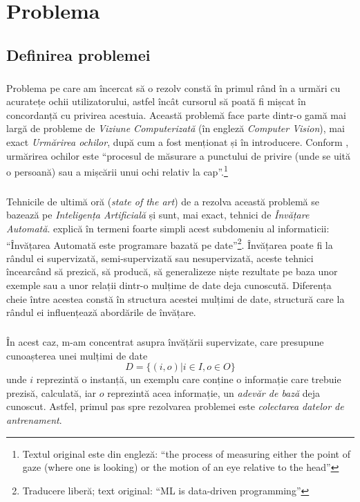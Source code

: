 \chapter{Problema}

\section{Definirea problemei}

\paragraph{}
Problema pe care am încercat să o rezolv constă în primul rând în a urmări cu acuratețe ochii utilizatorului, astfel încât cursorul să poată fi mișcat în concordanță cu privirea acestuia.
Această problemă face parte dintr-o gamă mai largă de probleme de \emph{Viziune Computerizată} (în engleză \emph{Computer Vision}), mai exact \emph{Urmărirea ochilor}, după cum a fost menționat și în introducere.
Conform \cite{eye_tracking}, urmărirea ochilor este ``procesul de măsurare a punctului de privire (unde se uită o persoană) sau a mișcării unui ochi relativ la cap''.\footnote{Textul original este din engleză: ``the process of measuring either the point of gaze (where one is looking) or the motion of an eye relative to the head''}

\paragraph{}
Tehnicile de ultimă oră (\emph{state of the art}) de a rezolva această problemă se bazează pe \emph{Inteligența Artificială} și sunt, mai exact, tehnici de \emph{Învățare Automată}.
\cite{liviu_ciortuz_ml} explică în termeni foarte simpli acest subdomeniu al informaticii: ``Învățarea Automată este programare bazată pe date''\footnote{Traducere liberă; text original: ``ML is data-driven programming''}.
Învățarea poate fi la rândul ei supervizată, semi-supervizată sau nesupervizată, aceste tehnici încearcând să prezică, să producă, să generalizeze niște rezultate pe baza unor exemple sau a unor relații dintr-o mulțime de date deja cunoscută.
Diferența cheie între acestea constă în structura acestei mulțimi de date, structură care la rândul ei influențează abordările de învățare.

\paragraph{}
În acest caz, m-am concentrat asupra învățării supervizate, care presupune cunoașterea unei mulțimi de date $$D = \{(i, o) | i \in I, o \in O\}$$
unde $i$ reprezintă o instanță, un exemplu care conține o informație care trebuie prezisă, calculată, iar $o$ reprezintă acea informație, un \emph{adevăr de bază} deja cunoscut.
Astfel, primul pas spre rezolvarea problemei este \emph{colectarea datelor de antrenament}.

